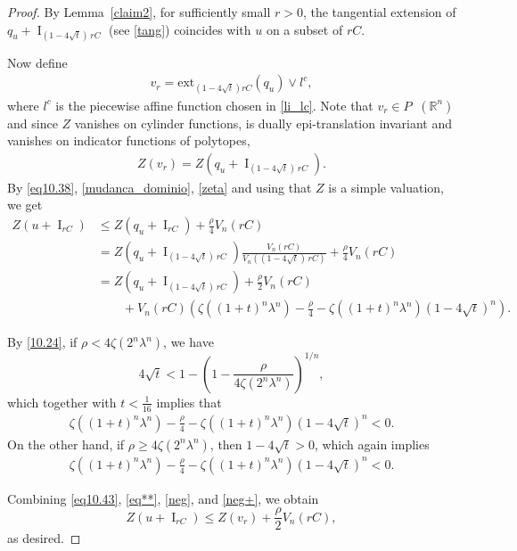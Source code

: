 \documentclass[11pt]{article}
\theoremstyle{definition} %
\newcommand{\RR}{(\mathbb{R}^n)}
\DeclareMathOperator{\I}{I}
\DeclareMathOperator{\LQ}{_{l.q}}
\begin{document}
\begin{proof}
By Lemma~\ref{claim2}, for sufficiently small $r>0$, the tangential extension of $q_u+ \I_{(1-4\sqrt{t})\,rC}$ (see \eqref{tang}) coincides with $u$ on a subset of $rC$.

Now define 
\begin{align}\label{eq10.42}
v_r = \mathrm{ext}_{(1-4\sqrt{t}) rC}(q_u) \vee  l^c, 
\end{align}
where $l^c$ is the piecewise affine function chosen in \eqref{li_lc}. Note that $v_r \in P\LQ\RR$ and since $Z$ vanishes on cylinder functions, is dually epi-translation invariant and vanishes on indicator functions of polytopes,
\begin{align}\label{eq10.43}
 Z(v_r) = Z(q_u + \I_{(1-4\sqrt{t})\,rC}).  
\end{align}
By \eqref{eq10.38}, \eqref{mudanca_dominio}, \eqref{zeta} and using that $Z$ is a simple valuation, we get
\begin{align}
    \nonumber  Z(u + \I_{rC}) & \leq Z(q_u+\I_{rC})+\frac{\rho}{4}V_n(rC)\\
    \nonumber & = Z(q_u+\I_{(1-4\sqrt{t})\,rC})\frac{V_n(rC)}{V_n((1-4\sqrt{t})\,rC)}+\frac{\rho}{4}V_n(rC)\\
    \nonumber & = Z(q_u+\I_{(1-4\sqrt{t})\,rC}) +\frac{\rho}{2}V_n(rC)\\
     & \qquad + V_n(rC)\left(\zeta((1+t)^n\lambda^n) - \frac{\rho}{4} - \zeta((1+t)^n\lambda^n)(1-4\sqrt{t})^n \right).\label{eq**}
\end{align}

By \eqref{10.24}, if $\rho<4\zeta(2^n\lambda^n)$,  we have
$$
4\sqrt{t}< 1 - \left(1-\frac{\rho}{4\zeta(2^n\lambda^n)}\right)^{1/n},
$$
which together with $t<\frac{1}{16}$ implies that
\begin{align}\label{neg}
\zeta((1+t)^n\lambda^n)-\frac{\rho}{4}-\zeta((1+t)^n\lambda^n)(1-4\sqrt{t})^n < 0.  
\end{align}
On the other hand, if $\rho \ge 4\zeta(2^n\lambda^n)$, then $1 - 4\sqrt{t} > 0$, which again implies 
\begin{align}\label{neg+}
\zeta((1+t)^n\lambda^n)-\frac{\rho}{4}-\zeta((1+t)^n\lambda^n)(1-4\sqrt{t})^n < 0.  
\end{align}



Combining \eqref{eq10.43}, \eqref{eq**}, \eqref{neg}, and \eqref{neg+}, we obtain
$$
Z(u + \I_{rC}) \leq Z(v_r) + \frac{\rho}{2}V_n(rC),
$$
as desired.
\end{proof}
\end{document}
